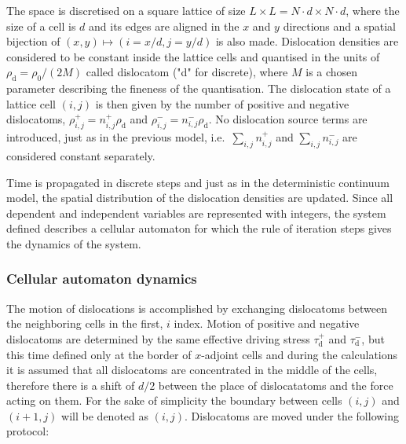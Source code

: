 The space is discretised on a square lattice of size $L \times L = N \cdot d \times N \cdot d$, where the size of a cell is $d$ and its edges are aligned in the $x$ and $y$ directions and a spatial bijection of $\left( {x,y} \right) \mapsto \left( {i = x/d,j = y/d} \right)$ is also made. Dislocation densities are considered to be constant inside the lattice cells and quantised in the units of ${\rho _{\text{d}}} = {\rho _0}/\left( {2M} \right)$ called dislocatom ("d" for discrete), where $M$ is a chosen parameter describing the fineness of the quantisation. The dislocation state of a lattice cell $\left( {i,j} \right)$ is then given by the number of positive and negative dislocatoms, $\rho _{i,j}^ +  = n_{i,j}^ + {\rho _{\text{d}}}$ and $\rho _{i,j}^ -  = n_{i,j}^ - {\rho _{\text{d}}}$. No dislocation source terms are introduced, just as in the previous model, i.e.\ $\sum\nolimits_{i,j} {n_{i,j}^ + } $ and $\sum\nolimits_{i,j} {n_{i,j}^ - } $ are considered constant separately.

Time is propagated in discrete steps and just as in the deterministic continuum model, the spatial distribution of the dislocation densities are updated. Since all dependent and independent variables are represented with integers, the system defined describes a cellular automaton for which the rule of iteration steps gives the dynamics of the system.

\subsubsection{Cellular automaton dynamics}
The motion of dislocations is accomplished by exchanging dislocatoms between the neighboring cells in the first, $i$ index. Motion of positive and negative dislocatoms are determined by the same effective driving stress $\tau _{\text{d}}^ + $ and $\tau _{\text{d}}^ - $, but this time defined only at the border of $x$-adjoint cells and during the calculations it is assumed that all dislocatoms are concentrated in the middle of the cells, therefore there is a shift of $d/2$ between the place of dislocatatoms and the force acting on them. For the sake of simplicity the boundary between cells $\left( {i,j} \right)$ and $\left( {i+1,j} \right)$ will be denoted as $\left( {i,j} \right)$. Dislocatoms are moved under the following protocol:

